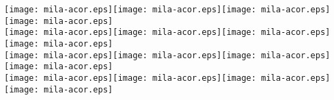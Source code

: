 \documentclass{standalone}
\newcommand{\glumarko}{\texttt{[image: mila-acor.eps]}}
\begin{document}
\begin{minipage}{\paperwidth}
\glumarko\hfill\glumarko\hfill\glumarko\hfill\glumarko\\
\glumarko\hfill\glumarko\hfill\glumarko\hfill\glumarko\\
\glumarko\hfill\glumarko\hfill\glumarko\hfill\glumarko\\
\glumarko\hfill\glumarko\hfill\glumarko\hfill\glumarko
\end{minipage}
\end{document}
